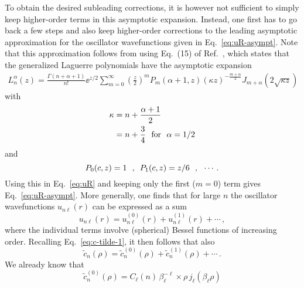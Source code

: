  To obtain the desired subleading corrections, it is however not sufficient to
  simply keep higher-order terms in this asymptotic expansion.  Instead, one
  first has to go back a few steps and also keep higher-order corrections to
  the leading asymptotic approximation for the oscillator wavefunctions given
  in Eq.~\eqref{eq:uR-asympt}.  Note that this approximation follows from using
  Eq.~(15) of Ref.~\cite{Deano2013}, which states that the generalized
  Laguerre polynomials have the asymptotic expansion
  \begin{multline}
   L_n^\alpha(z) = \frac{\Gamma(n+\alpha+1)}{n!}\ee^{z/2}
   \sum\limits_{m=0}^\infty \left(\frac{z}{2}\right)^m P_m(\alpha+1,z)
   (\kappa z)^{-\frac{m+\alpha}{2}} J_{m+\alpha}(2\sqrt{\kappa z})
  \label{eq:Laguerre-expansion}
  \end{multline}
  with
  \begin{subequations}\begin{align}
   \kappa &= n + \frac{\alpha+1}{2} \\ &= n+\frac34 \ \ \text{for}\ \  \alpha=1/2
  \label{eq:kappa}
  \end{align}\end{subequations}
  and
  \begin{equation}
   P_0(c,z) = 1 \ \ \text{,}\ \  P_1(c,z) = z/6 \ \ \text{,}\ \  \cdots \,.
  \label{eq:P0-P1}
  \end{equation}
  Using this in Eq.~\eqref{eq:uR} and keeping only the first ($m=0$) term gives
  Eq.~\eqref{eq:uR-asympt}.  More generally, one finds that for large $n$ the
  oscillator wavefunctions $u_{n\ell}(r)$ can be expressed as a sum
  \begin{equation}
   u_{n\ell}(r) = u_{n\ell}^{(0)}(r) + u_{n\ell}^{(1)}(r) + \cdots \,,
  \label{eq:u-sum}
  \end{equation}
  where the individual terms involve (spherical) Bessel functions of
  increasing order.  Recalling Eq.~\eqref{eq:c-tilde-1}, it then follows that
  also
  \begin{equation}
   \tilde{c}_n(\rho) = \tilde{c}_n^{(0)}(\rho)+\tilde{c}_n^{(1)}(\rho)
   +\cdots \,.
  \label{eq:c-tilde-sum}
  \end{equation}
  We already know that
  \begin{equation}
   \tilde{c}_n^{(0)}(\rho) = C_\ell (n)\,\beta_\ell^{-\ell}
   \times\rho\,j_\ell(\beta_\ell\rho)
  \label{eq:c-tilde-j0}
  \end{equation}

